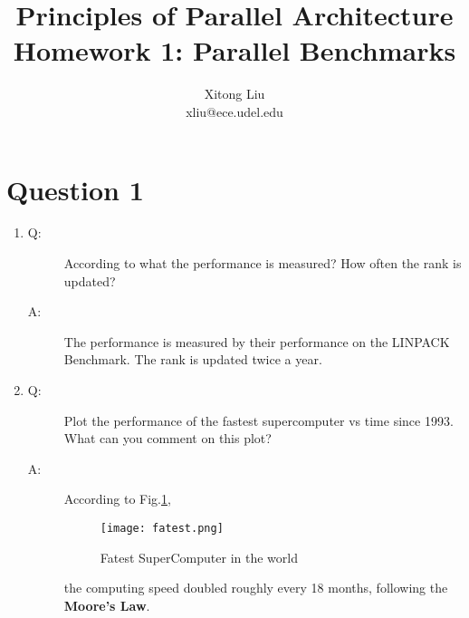 \documentclass[12pt]{article}
\title{Principles of Parallel Architecture\\
Homework 1: Parallel Benchmarks}
\author{Xitong Liu \\
xliu@ece.udel.edu}
\begin{document}
\maketitle

\section{Question 1}
\begin{enumerate}

\item
\begin{description}
\item[Q: ]According to what the performance is measured? How often the 
rank is updated?
\item[A:]The performance is measured by their performance on the LINPACK 
Benchmark. The rank is updated twice a year.
\end{description}

\item
\begin{description}
\item[Q: ]Plot the performance of the fastest supercomputer vs time since 
1993. What can you comment on this plot?
\item[A: ]According to Fig.\ref{fig:fatest}, 
\begin{figure}[h!]
	\begin{center}
		\texttt{[image: fatest.png]}
		\caption{\label{fig:fatest}Fatest SuperComputer in the world}
	\end{center}
\end{figure}
the computing speed doubled roughly every 18 months, following 
the \textbf{Moore's Law}.
\end{description}

\end{enumerate}
\end{document}
